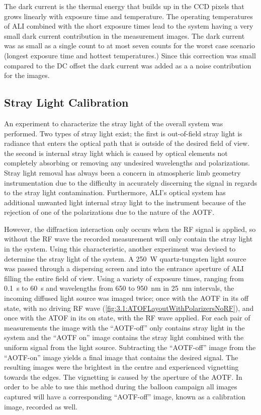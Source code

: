 \documentclass[12pt]{article}
\begin{document}
The dark current is the thermal energy that builds up in the CCD pixels that grows linearly with exposure time and temperature. The operating temperatures of ALI combined with the short exposure times lead to the system having a very small dark current contribution in the measurement images. The dark current was as small as a single count to at most seven counts for the worst case scenario (longest exposure time and hottest temperatures.) Since this correction was small compared to the DC offset the dark current was added as a a noise contribution for the images.

\subsection{Stray Light Calibration}

An experiment to characterize the stray light of the overall system was performed. Two types of stray light exist; the first is out-of-field stray light is radiance that enters the optical path that is outside of the desired field of view. the second is internal stray light which is caused by optical elements not completely absorbing or removing any undesired wavelengths and polarizations. Stray light removal has always been a concern in atmospheric limb geometry instrumentation due to the difficulty in accurately discerning the signal in regards to the stray light contamination. Furthermore, ALI's optical system has additional unwanted light internal stray light to the instrument because of the rejection of one of the polarizations due to the nature of the AOTF.

However, the diffraction interaction only occurs when the RF signal is applied, so without the RF wave the recorded measurement will only contain the stray light in the system. Using this characteristic, another experiment was devised to determine the stray light of the system. A 250~W quartz-tungsten light source was passed through a dispersing screen and into the entrance aperture of ALI filling the entire field of view. Using a variety of exposure times, ranging from 0.1~s to 60~s and wavelengths from 650 to 950~nm in 25~nm intervals, the incoming diffused light source was imaged twice; once with the AOTF in its off state, with no driving RF wave (\autoref{fig:3.1:ATOFLayoutWithPolarizersNoRF}), and once with the ATOF in its on state, with the RF wave applied. For each pair of measurements the image with the ``AOTF-off'' only contains stray light in the system and the ``AOTF on'' image contains the stray light combined with the uniform signal from the light source. Subtracting the ``AOTF-off'' image from the ``AOTF-on'' image yields a final image that contains the desired signal. The resulting images were the brightest in the centre and experienced vignetting towards the edges. The vignetting is caused by the aperture of the AOTF. In order to be able to use this method during the balloon campaign all images captured will have a corresponding ``AOTF-off'' image, known as a calibration image, recorded as well.
\end{document}
